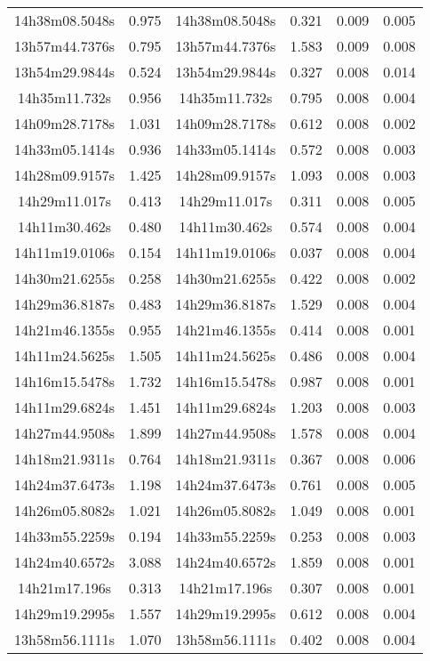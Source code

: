 \begin{table}
\begin{tabular}{cccccc}
14h38m08.5048s & 0.975 & 14h38m08.5048s & 0.321 & 0.009 & 0.005 \\
13h57m44.7376s & 0.795 & 13h57m44.7376s & 1.583 & 0.009 & 0.008 \\
13h54m29.9844s & 0.524 & 13h54m29.9844s & 0.327 & 0.008 & 0.014 \\
14h35m11.732s & 0.956 & 14h35m11.732s & 0.795 & 0.008 & 0.004 \\
14h09m28.7178s & 1.031 & 14h09m28.7178s & 0.612 & 0.008 & 0.002 \\
14h33m05.1414s & 0.936 & 14h33m05.1414s & 0.572 & 0.008 & 0.003 \\
14h28m09.9157s & 1.425 & 14h28m09.9157s & 1.093 & 0.008 & 0.003 \\
14h29m11.017s & 0.413 & 14h29m11.017s & 0.311 & 0.008 & 0.005 \\
14h11m30.462s & 0.480 & 14h11m30.462s & 0.574 & 0.008 & 0.004 \\
14h11m19.0106s & 0.154 & 14h11m19.0106s & 0.037 & 0.008 & 0.004 \\
14h30m21.6255s & 0.258 & 14h30m21.6255s & 0.422 & 0.008 & 0.002 \\
14h29m36.8187s & 0.483 & 14h29m36.8187s & 1.529 & 0.008 & 0.004 \\
14h21m46.1355s & 0.955 & 14h21m46.1355s & 0.414 & 0.008 & 0.001 \\
14h11m24.5625s & 1.505 & 14h11m24.5625s & 0.486 & 0.008 & 0.004 \\
14h16m15.5478s & 1.732 & 14h16m15.5478s & 0.987 & 0.008 & 0.001 \\
14h11m29.6824s & 1.451 & 14h11m29.6824s & 1.203 & 0.008 & 0.003 \\
14h27m44.9508s & 1.899 & 14h27m44.9508s & 1.578 & 0.008 & 0.004 \\
14h18m21.9311s & 0.764 & 14h18m21.9311s & 0.367 & 0.008 & 0.006 \\
14h24m37.6473s & 1.198 & 14h24m37.6473s & 0.761 & 0.008 & 0.005 \\
14h26m05.8082s & 1.021 & 14h26m05.8082s & 1.049 & 0.008 & 0.001 \\
14h33m55.2259s & 0.194 & 14h33m55.2259s & 0.253 & 0.008 & 0.003 \\
14h24m40.6572s & 3.088 & 14h24m40.6572s & 1.859 & 0.008 & 0.001 \\
14h21m17.196s & 0.313 & 14h21m17.196s & 0.307 & 0.008 & 0.001 \\
14h29m19.2995s & 1.557 & 14h29m19.2995s & 0.612 & 0.008 & 0.004 \\
13h58m56.1111s & 1.070 & 13h58m56.1111s & 0.402 & 0.008 & 0.004 \\

\end{tabular}
\end{table}
